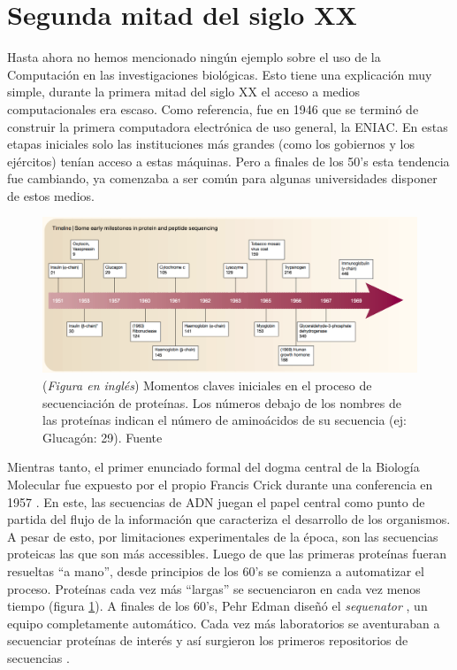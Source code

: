 \section{Segunda mitad del siglo XX}
 
Hasta ahora no hemos mencionado ningún ejemplo sobre el uso de la Computación en las investigaciones biológicas.
Esto tiene una explicación muy simple, durante la primera mitad del siglo XX el acceso a medios computacionales era escaso.
Como referencia, fue en 1946 que se terminó de construir la primera computadora electrónica de uso general, la ENIAC.
En estas etapas iniciales solo las instituciones más grandes (como los gobiernos y los ejércitos) tenían acceso a estas máquinas.
Pero a finales de los 50's esta tendencia fue cambiando, ya comenzaba a ser común para algunas universidades disponer de estos medios.
 
\begin{figure}[tb]
   \centering
   \includegraphics[width=1.0\columnwidth]{images/Protain_seq_milestones.png}
   \caption{
       (\textit{Figura en inglés})
       Momentos claves iniciales en el proceso de secuenciación de proteínas.
       Los números debajo de los nombres de las proteínas indican el número de aminoácidos de su secuencia (ej: Glucagón: 29).
       Fuente \cite{hagenOriginsBioinformatics2000}}
   \label{fig:Protain_seq_milestones}
\end{figure}
 
Mientras tanto, el primer enunciado formal del dogma central de la Biología Molecular fue expuesto por el propio Francis Crick durante una conferencia en 1957 \cite{cobb60YearsAgo2017}.
En este, las secuencias de ADN juegan el papel central como punto de partida del flujo de la información que caracteriza el desarrollo de los organismos.
A pesar de esto, por limitaciones experimentales de la época, son las secuencias proteicas las que son más accessibles.
Luego de que las primeras proteínas fueran resueltas ``a mano'', desde principios de los 60's se comienza a automatizar el proceso.
Proteínas cada vez más ``largas'' se secuenciaron en cada vez menos tiempo (figura \ref{fig:Protain_seq_milestones}).
A finales de los 60's, Pehr Edman diseñó el \textit{sequenator} \cite{edmanProteinSequenator1967}, un equipo completamente automático.
Cada vez más laboratorios se aventuraban a secuenciar proteínas de interés y así surgieron los primeros repositorios de secuencias \cite{hagenOriginsBioinformatics2000}.
 
